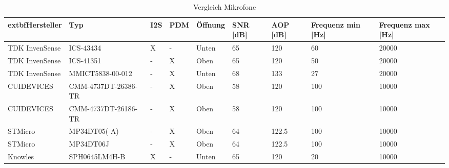 ﻿\begin{table}[!ht]
    \centering
    \begin{tabular}{|l|l|l|l|l|l|l|l|l|}
    \hline
        	extbf{Hersteller} & \textbf{Typ} & \textbf{I2S} & \textbf{PDM} & \textbf{Öffnung} & \textbf{SNR [dB]} & \textbf{AOP [dB]} & \textbf{Frequenz min [Hz]} & \textbf{Frequenz max [Hz]} \\ \hline
        TDK InvenSense & ICS-43434 & X & - & Unten & 65 & 120 & 60 & 20000 \\ \hline
        TDK InvenSense & ICS-41351 & - & X & Oben & 65 & 120 & 50 & 20000 \\ \hline
        TDK InvenSense & MMICT5838-00-012 & - & X & Unten & 68 & 133 & 27 & 20000 \\ \hline
        CUIDEVICES & CMM-4737DT-26386-TR & - & X & Oben & 58 & 120 & 100 & 10000 \\ \hline
        CUIDEVICES & CMM-4737DT-26186-TR & - & X & Oben & 58 & 120 & 100 & 10000 \\ \hline
        STMicro & MP34DT05(-A) & - & X & Oben & 64 & 122.5 & 100 & 10000 \\ \hline
        STMicro & MP34DT06J & - & X & Oben & 64 & 122.5 & 100 & 10000 \\ \hline
        Knowles & SPH0645LM4H-B & X & - & Unten & 65 & 120 & 20 & 10000 \\ \hline
    \end{tabular}
    \caption{Vergleich Mikrofone}
    \label{table:vergleich-mikrofone}
\end{table}